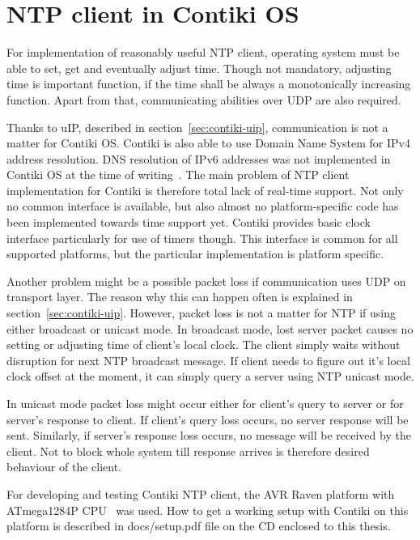 
\chapter{NTP client in Contiki OS}
For implementation of reasonably useful NTP client,
operating system must be able to set, get
and eventually adjust time.
Though not mandatory, adjusting time is important function,
if the time shall be always a monotonically increasing function.
Apart from that, communicating abilities over UDP are also required.

Thanks to uIP, described in section~\ref{sec:contiki-uip}, communication is
not a matter for Contiki OS.
Contiki is also able to use Domain Name System for IPv4 address resolution.
DNS resolution of IPv6 addresses was not implemented in Contiki OS
at the time of writing~\cite{contiki-docs}.
The main problem of NTP client implementation for Contiki is therefore total
lack of real-time support.
Not only no common interface is available, but also
almost no platform-specific code has been implemented towards time support yet.
Contiki provides basic clock interface particularly for use of timers though.
This interface is common for all supported platforms,
but the particular implementation is platform specific.

Another problem might be a possible packet loss if communication uses UDP on transport layer.
The reason why this can happen often is explained in section~\ref{sec:contiki-uip}.
However, packet loss is not a matter for NTP if using either broadcast or unicast mode.
In broadcast mode, lost server packet causes no setting or adjusting time of client's
local clock.
The client simply waits without disruption for next NTP broadcast message.
If client needs to figure out it's local clock offset at the moment,
it can simply query a server using NTP unicast mode.

In unicast mode packet loss might occur either for client's query to server
or for server's response to client.
If client's query loss occurs, no server response will be sent.
Similarly, if server's response loss occurs, no message will be received by the client.
Not to block whole system till response arrives
is therefore desired behaviour of the client.


For developing and testing Contiki NTP client,
the AVR Raven platform with ATmega1284P CPU~\cite{avr-datasheet} was used.
How to get a working setup with Contiki on this platform is described in
docs/setup.pdf file on the CD enclosed to this thesis.








